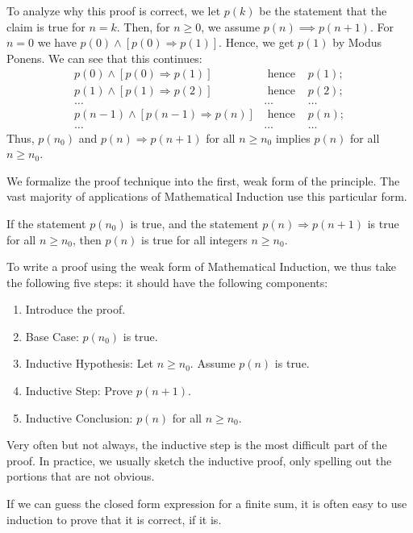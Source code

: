 To analyze why this proof is correct,
we let $p(k)$ be the statement that the claim is true for $n=k$.
Then, for $n \geq 0$, we assume $p(n) \implies p(n+1)$.
For $n=0$ we have $p(0) \wedge [p(0) \Rightarrow p(1)]$.
Hence, we get $p(1)$ by Modus Ponens.
We can see that this continues:
\begin{eqnarray*}
  p(0) \wedge [p(0)     \Rightarrow p(1)]  &\text{ hence }&  p(1); \\
  p(1) \wedge [p(1)     \Rightarrow p(2)]  &\text{ hence }&  p(2); \\
   \ldots &\ldots& \ldots \\
  p(n-1) \wedge [p(n-1) \Rightarrow p(n)]  &\text{ hence }&  p(n); \\
   \ldots &\ldots& \ldots
\end{eqnarray*}
Thus, $p(n_0)$ and $p(n) \Rightarrow p(n+1)$ for all $n \geq n_0$
implies $p(n)$ for all $n \geq n_0$.

We formalize the proof technique into the first, weak form of
the principle.
The vast majority of applications of Mathematical Induction
use this particular form.

\begin{definition}
    If the statement $p(n_0)$ is true, and the
    statement $p(n) \Rightarrow p(n+1)$ is true for all $n \geq n_0$,
    then $p(n)$ is true for all integers $n \geq n_0$.
\end{definition}

To write a proof using the weak form of Mathematical Induction,
we thus take the following five steps:
it should have the following components:
\begin{enumerate}
    \item Introduce the proof.
    \item Base Case:            $p(n_0)$ is true.
    \item Inductive Hypothesis: Let $n \geq n_0$. Assume $p(n)$ is true.
    \item Inductive Step:       Prove $p(n+1)$.
    \item Inductive Conclusion: $p(n)$ for all $n \geq n_0$.
\end{enumerate}
Very often but not always, the inductive step is the most
difficult part of the proof.
In practice, we usually sketch the inductive proof,
only spelling out the portions that are not obvious.

If we can guess the closed form expression for a finite sum,
it is often easy to use induction to prove that it is correct,
if it is.

